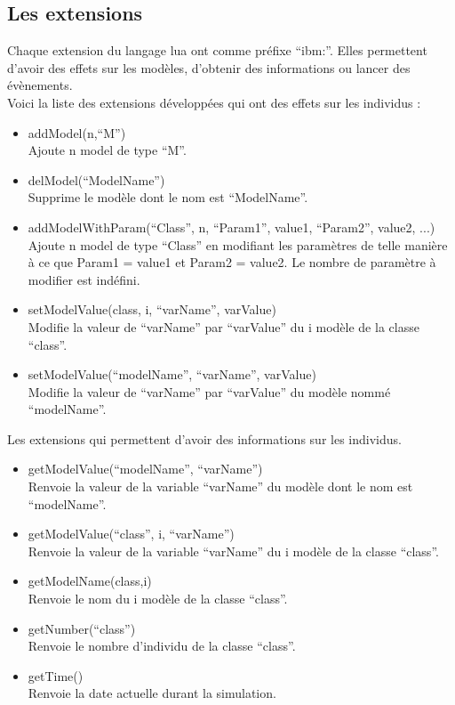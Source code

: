 \subsection{Les extensions}
Chaque extension du langage lua ont comme préfixe ``ibm\string:''. Elles permettent d'avoir des effets sur les modèles, d'obtenir des informations ou lancer des évènements.\\
Voici la liste des extensions développées qui ont des effets sur les individus :
\begin{itemize}[label=\textbullet,font=\large]
	\item addModel(n,``M'')\\
	Ajoute n model de type ``M''.
	\item delModel(``ModelName'')\\
	Supprime le modèle dont le nom est ``ModelName''.
	\item addModelWithParam(``Class'', n, ``Param1'', value1, ``Param2'', value2, ...)\\
	Ajoute n model de type ``Class'' en modifiant les paramètres de telle manière à ce que Param1 = value1 et Param2 = value2. Le nombre de paramètre à modifier est indéfini.
	\item setModelValue(class, i, ``varName'', varValue)\\
	Modifie la valeur de ``varName'' par ``varValue'' du i modèle de la classe ``class''.
	\item setModelValue(``modelName'', ``varName'', varValue)\\
	Modifie la valeur de ``varName'' par ``varValue'' du modèle nommé ``modelName''.
\end{itemize}
Les extensions qui permettent d'avoir des informations sur les individus.
\begin{itemize}[label=\textbullet,font=\large]
	\item getModelValue(``modelName'', ``varName'')\\
	Renvoie la valeur de la variable ``varName'' du modèle dont le nom est ``modelName''.
	\item getModelValue(``class'', i, ``varName'')\\
	Renvoie la valeur de la variable ``varName'' du i modèle de la classe ``class''.
	\item getModelName(class,i)\\
	Renvoie le nom du i modèle de la classe ``class''.
	\item getNumber(``class'')\\
	Renvoie le nombre d'individu de la classe ``class''.
	\item getTime()\\
	Renvoie la date actuelle durant la simulation.
\end{itemize}

